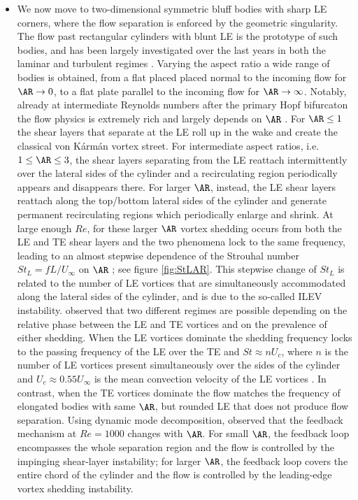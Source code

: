 \documentclass[onecolumn,notitlepage,superscriptaddress, amsmath,amssymb,longbibliographyaps,floatfix]{revtex4-1}
\begin{document}
\begin{itemize}
  \item We now move to two-dimensional symmetric bluff bodies with sharp LE corners, where the flow separation is enforced by the geometric singularity. The flow past rectangular cylinders with blunt LE is the prototype of such bodies, and has been largely investigated over the last years in both the laminar and turbulent regimes \citep{houringan-etal-2001,cimarelli-etal-2018,chiarini-quadrio-auteri-2021,zhang-etal-2023,cimarelli-etal-2023}. Varying the aspect ratio a wide range of bodies is obtained, from a flat placed placed normal to the incoming flow for $\AR \rightarrow 0$, to a flat plate parallel to the incoming flow for $\AR \rightarrow \infty$. Notably, already at intermediate Reynolds numbers after the primary Hopf bifurcaton the flow physics is extremely rich and largely depends on $\AR$ \citep[see for example][]{okajima-1982,nakamura-etal-1991,mills-1995}. For $\AR \le 1$ the shear layers that separate at the LE roll up in the wake and create the classical von K\'{a}rm\'{a}n vortex street. For intermediate aspect ratios, i.e. $1 \le \AR \le 3$, the shear layers separating from the LE reattach intermittently over the lateral sides of the cylinder and a recirculating region periodically appears and disappears there. For larger $\AR$, instead, the LE shear layers reattach along the top/bottom lateral sides of the cylinder and generate permanent recirculating regions which periodically enlarge and shrink. At large enough $Re$, for these larger $\AR$ vortex shedding occurs from both the LE and TE shear layers and the two phenomena lock to the same frequency, leading to an almost stepwise dependence of the Strouhal number $St_L=fL/U_\infty$ on $\AR$ \citep{okajima-1982,nakamura-etal-1991,hourigan-etal-2001}; see figure \ref{fig:StLAR}. This stepwise change of $St_L$ is related to the number of LE vortices that are simultaneously accommodated along the lateral sides of the cylinder, and is due to the so-called ILEV instability. \cite{chiarini-etal-2022} observed that two different regimes are possible depending on the relative phase between the LE and TE vortices and on the prevalence of either shedding. When the LE vortices dominate the shedding frequency locks to the passing frequency of the LE over the TE and $St \approx n U_c$, where $n$ is the number of LE vortices present simultaneously over the sides of the cylinder and $U_c \approx 0.55 U_\infty$ is the mean convection velocity of the LE vortices \citep[see also][]{mills-sheridan-hourigan-2002,tan-thompson-hourigan-2004}. In contrast, when the TE vortices dominate the flow matches the frequency of elongated bodies with same $\AR$, but rounded LE that does not produce flow separation. Using dynamic mode decomposition, \cite{zhang-etal-2023} observed that the feedback mechanism at $Re = 1000$ changes with $\AR$. For small $\AR$, the feedback loop encompasses the whole separation region and the flow is controlled by the impinging shear-layer instability; for larger $\AR$, the feedback loop covers the entire chord of the cylinder and the flow is controlled by the leading-edge vortex shedding instability.
  

\end{itemize}
\end{document}

